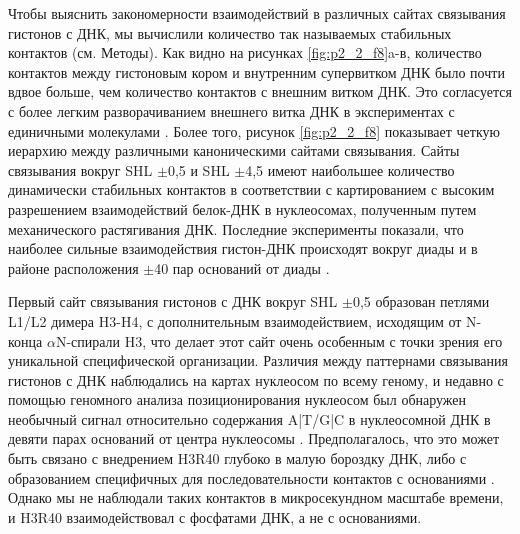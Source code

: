     Чтобы выяснить закономерности взаимодействий в различных сайтах связывания гистонов с ДНК, мы вычислили количество так называемых стабильных контактов (см. Методы). Как видно на рисунках \ref{fig:p2_2_f8}a-в, количество контактов между гистоновым кором и внутренним супервитком ДНК было почти вдвое больше, чем количество контактов с внешним витком ДНК. Это согласуется с более легким разворачиванием внешнего витка ДНК в экспериментах с единичными молекулами \cite{hall_high_2009,brower-toland_mechanical_2002}. Более того, рисунок \ref{fig:p2_2_f8} показывает четкую иерархию между различными каноническими сайтами связывания. Сайты связывания вокруг SHL $\pm$0,5 и SHL $\pm$4,5 имеют наибольшее количество динамически стабильных контактов в соответствии с картированием с высоким разрешением взаимодействий белок-ДНК в нуклеосомах, полученным путем механического растягивания ДНК. Последние эксперименты показали, что наиболее сильные взаимодействия гистон-ДНК происходят вокруг диады и в районе расположения $\pm$40 пар оснований от диады \cite{hall_high_2009}.
    
    Первый сайт связывания гистонов с ДНК вокруг SHL $\pm$0,5 образован петлями L1/L2 димера H3-H4, с дополнительным взаимодействием, исходящим от N-конца $\alpha$N-спирали H3, что делает этот сайт очень особенным с точки зрения его уникальной специфической организации. Различия между паттернами связывания гистонов с ДНК наблюдались на картах нуклеосом по всему геному, и недавно с помощью геномного анализа позиционирования нуклеосом был обнаружен необычный сигнал относительно содержания A|T/G|C в нуклеосомной ДНК в девяти парах оснований от центра нуклеосомы \cite{brogaard_map_2012}. Предполагалось, что это может быть связано с внедрением H3R40 глубоко в малую бороздку ДНК, либо с образованием специфичных для последовательности контактов с основаниями \cite{davey_does_2013}. Однако мы не наблюдали таких контактов в микросекундном масштабе времени, и H3R40 взаимодействовал с фосфатами ДНК, а не с основаниями.
    
